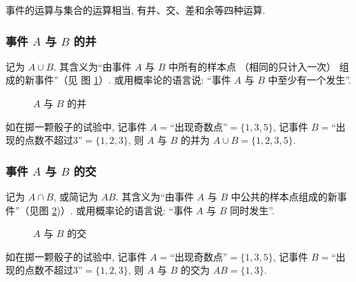 事件的运算与集合的运算相当,
有并、交、差和余等四种运算.

\subsubsection{事件 $A$ 与 $B$ 的并}
记为 $A \cup B$.
其含义为“由事件 $A$ 与 $B$ 中所有的样本点 （相同的只计入一次） 组成的新事件”（见 图 \ref{fig1.1.5}）.
或用概率论的语言说:
“事件 $A$ 与 $B$ 中至少有一个发生”.

\begin{figure}[!ht]
  \centering
  \caption{$A$ 与 $B$ 的并}\label{fig1.1.5}
\end{figure}

如在掷一颗骰子的试验中,
记事件 $A=$“出现奇数点”$=\{1,3,5\}$,
记事件 $B=$“出现的点数不超过3”$=\{1,2,3\}$,
则 $A$ 与 $B$ 的并为 $A \cup B = \{1,2,3,5\}$.

\subsubsection{事件 $A$ 与 $B$ 的交}

记为 $A \cap B$,
或简记为 $AB$.
其含义为“由事件 $A$ 与 $B$ 中公共的样本点组成的新事件”（见图 \ref{fig1.1.6})）.
或用概率论的语言说:
“事件 $A$ 与 $B$ 同时发生”.

\begin{figure}[!ht]
  \centering
  \caption{$A$ 与 $B$ 的交}\label{fig1.1.6}
\end{figure}

如在掷一颗骰子的试验中,
记事件 $A=$“出现奇数点”$=\{1,3,5\}$,
记事件 $B=$“出现的点数不超过3”$=\{1,2,3\}$,
则 $A$ 与 $B$ 的交为 $AB = \{1,3\}$.

